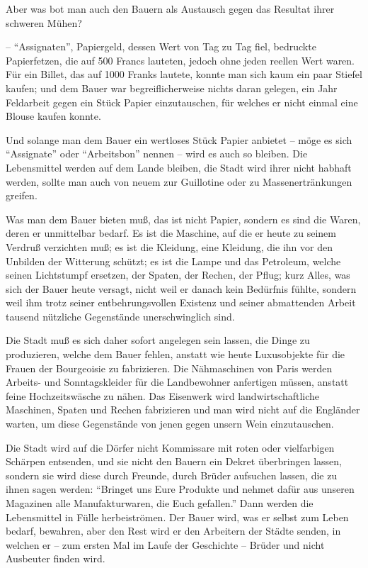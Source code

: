 \documentclass{scrbook}
\begin{document}
Aber was bot man auch den Bauern als Austausch gegen das Resultat ihrer schweren Mühen?

– ``Assignaten'', Papiergeld, dessen Wert von Tag zu Tag fiel, bedruckte Papierfetzen, die auf 500 Francs lauteten, jedoch ohne jeden reellen Wert waren. Für ein Billet, das auf 1000 Franks lautete, konnte man sich kaum ein paar Stiefel kaufen; und dem Bauer war begreiflicherweise nichts daran gelegen, ein Jahr Feldarbeit gegen ein Stück Papier einzutauschen, für welches er nicht einmal eine Blouse kaufen konnte.

Und solange man dem Bauer ein wertloses Stück Papier anbietet – möge es sich ``Assignate'' oder ``Arbeitsbon'' nennen – wird es auch so bleiben. Die Lebensmittel werden auf dem Lande bleiben, die Stadt wird ihrer nicht habhaft werden, sollte man auch von neuem zur Guillotine oder zu Massenertränkungen greifen.

Was man dem Bauer bieten muß, das ist nicht Papier, sondern es sind die Waren, deren er unmittelbar bedarf. Es ist die Maschine, auf die er heute zu seinem Verdruß verzichten muß; es ist die Kleidung, eine Kleidung, die ihn vor den Unbilden der Witterung schützt; es ist die Lampe und das Petroleum, welche seinen Lichtstumpf ersetzen, der Spaten, der Rechen, der Pflug; kurz Alles, was sich der Bauer heute versagt, nicht weil er danach kein Bedürfnis fühlte, sondern weil ihm trotz seiner entbehrungsvollen Existenz und seiner abmattenden Arbeit tausend nützliche Gegenstände unerschwinglich sind.

Die Stadt muß es sich daher sofort angelegen sein lassen, die Dinge zu produzieren, welche dem Bauer fehlen, anstatt wie heute Luxusobjekte für die Frauen der Bourgeoisie zu fabrizieren. Die Nähmaschinen von Paris werden Arbeits- und Sonntagskleider für die Landbewohner anfertigen müssen, anstatt feine Hochzeitswäsche zu nähen. Das Eisenwerk wird landwirtschaftliche Maschinen, Spaten und Rechen fabrizieren und man wird nicht auf die Engländer warten, um diese Gegenstände von jenen gegen unsern Wein einzutauschen.

Die Stadt wird auf die Dörfer nicht Kommissare mit roten oder vielfarbigen Schärpen entsenden, und sie nicht den Bauern ein Dekret überbringen lassen, sondern sie wird diese durch Freunde, durch Brüder aufsuchen lassen, die zu ihnen sagen werden: ``Bringet uns Eure Produkte und nehmet dafür aus unseren Magazinen alle Manufakturwaren, die Euch gefallen.'' Dann werden die Lebensmittel in Fülle herbeiströmen. Der Bauer wird, was er selbst zum Leben bedarf, bewahren, aber den Rest wird er den Arbeitern der Städte senden, in welchen er – zum ersten Mal im Laufe der Geschichte – Brüder und nicht Ausbeuter finden wird.
\end{document}
